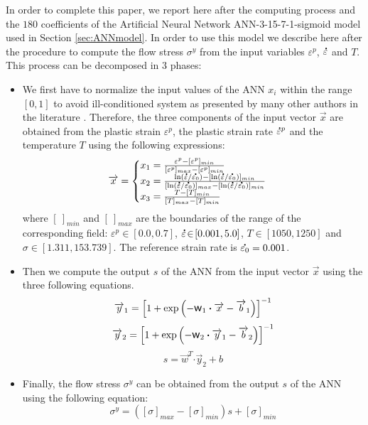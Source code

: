 \documentclass[twoside,english,1p,final,sort&compress]{elsarticle}
\theoremstyle{plain}
\DeclareRobustCommand{\w}{\mbox{\large\ensuremath{\mathsf{w}}}}
\DeclareRobustCommand{\dotp}{\boldsymbol{\cdot}}
\DeclareRobustCommand{\mdot}[1]{\accentset{\mbox{\bfseries .}}{#1}}
\begin{document}
In order to complete this paper, we report here after the computing process and the $180$ coefficients of the Artificial Neural Network ANN-3-15-7-1-sigmoid model used in Section \ref{sec:ANNmodel}.
In order to use this model we describe here after the procedure to compute the flow stress $\sigma^y$ from the input variables $\varepsilon^p$, $\mdot\varepsilon$ and $T$.
This process can be decomposed in 3 phases:
\begin{itemize}
\item We first have to normalize the input values of the ANN $x_i$ within the range $[0,1]$ to avoid ill-conditioned system as presented by many other authors in the literature \cite{Lin-2008-ANN, Lu-2011-ANN}.
Therefore, the three components of the input vector $\overrightarrow{x}$ are obtained from the plastic strain $\varepsilon^p$, the plastic strain rate $\mdot{\varepsilon}^p$ and the temperature $T$ using the following expressions:
\begin{equation}
\overrightarrow{x}=
\begin{cases}
x_1 = \frac{\varepsilon^p - [\varepsilon^p]_{min}}{[\varepsilon^p]_{max} - [\varepsilon^p]_{min}}\\
x_2 = \frac{\ln(\mdot{\varepsilon}/\mdot{\varepsilon_0})-[\ln(\mdot{\varepsilon}/\mdot{\varepsilon_0})]_{min}}{[\ln(\mdot{\varepsilon}/\mdot{\varepsilon_0})]_{max}-[\ln(\mdot{\varepsilon}/\mdot{\varepsilon_0})]_{min}}\label{eq:CR1}\\
x_3 = \frac{T-[T]_{min}}{[T]_{max}-[T]_{min}}
\end{cases}
\end{equation}
where $[~]_{min}$ and $[~]_{max}$  are the boundaries of the range of the corresponding field: $\varepsilon^p\!\in\!\left[0.0,0.7\right]$, $\mdot{\varepsilon}\!\in\!\left[0.001,5.0\right]$, $T\!\in\!\left[1050,1250\right]$ and $\sigma\!\in\!\left[1.311,153.739\right]$.
The reference strain rate is $\mdot{\varepsilon_0} = 0.001$.
\item Then we compute the output $s$ of the ANN from the input vector $\overrightarrow{x}$ using the three following equations.
\begin{equation}
\overrightarrow{y}_1 = \left[1 + \exp{\left(- \w_1 \dotp \overrightarrow{x}- \overrightarrow{b}_1\right)}\right]^{-1}
\end{equation}
\begin{equation}
\overrightarrow{y}_2 = \left[1 + \exp{\left(- \w_2 \dotp \overrightarrow{y}_1- \overrightarrow{b}_2\right)}\right]^{-1}
\end{equation}
\begin{equation}
s = \overrightarrow{w}^T \dotp \overrightarrow{y}_2 + b
\end{equation}
\item Finally, the flow stress $\sigma^y$ can be obtained from the output $s$ of the ANN using the following equation:
\begin{equation}
\sigma^y =  \left([\sigma]_{max}-[\sigma]_{min}\right)s + [\sigma]_{min} \label{eq:CR2}
\end{equation}
\end{itemize}
\end{document}
